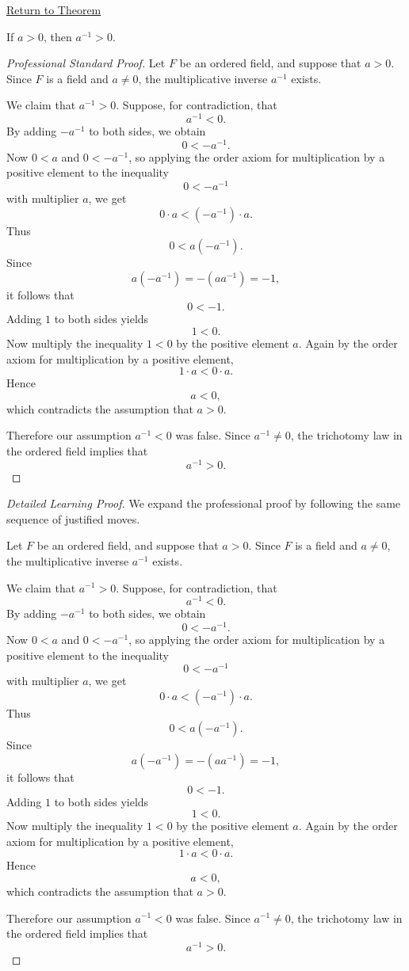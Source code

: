 \newpage
{}
\label{prf:inverse-positive}

\begin{remark*}[Return]
\hyperref[thm:inverse-positive]{Return to Theorem}
\end{remark*}

\begin{theorem*}
If $a>0$, then $a^{-1}>0$.
\end{theorem*}

\begin{proof}[Professional Standard Proof]
\LRAProofBodyStart
Let $F$ be an ordered field, and suppose that $a>0$.  Since $F$ is a field
and $a\neq 0$, the multiplicative inverse $a^{-1}$ exists.

We claim that $a^{-1}>0$.  Suppose, for contradiction, that
\[
a^{-1}<0.
\]
By adding $-a^{-1}$ to both sides, we obtain
\[
0<-a^{-1}.
\]
Now $0<a$ and $0<-a^{-1}$, so applying the order axiom for multiplication by
a positive element to the inequality
\[
0<-a^{-1}
\]
with multiplier $a$, we get
\[
0\cdot a<(-a^{-1})\cdot a.
\]
Thus
\[
0<a(-a^{-1}).
\]
Since
\[
a(-a^{-1})=-(aa^{-1})=-1,
\]
it follows that
\[
0<-1.
\]
Adding $1$ to both sides yields
\[
1<0.
\]
Now multiply the inequality $1<0$ by the positive element $a$.  Again by the
order axiom for multiplication by a positive element,
\[
1\cdot a<0\cdot a.
\]
Hence
\[
a<0,
\]
which contradicts the assumption that $a>0$.

Therefore our assumption $a^{-1}<0$ was false.  Since $a^{-1}\neq 0$, the
trichotomy law in the ordered field implies that
\[
a^{-1}>0.
\]
\end{proof}

\begin{proof}[Detailed Learning Proof]
\LRAProofBodyStart
We expand the professional proof by following the same sequence of justified moves.

Let $F$ be an ordered field, and suppose that $a>0$.  Since $F$ is a field
and $a\neq 0$, the multiplicative inverse $a^{-1}$ exists.

We claim that $a^{-1}>0$.  Suppose, for contradiction, that
\[
a^{-1}<0.
\]
By adding $-a^{-1}$ to both sides, we obtain
\[
0<-a^{-1}.
\]
Now $0<a$ and $0<-a^{-1}$, so applying the order axiom for multiplication by
a positive element to the inequality
\[
0<-a^{-1}
\]
with multiplier $a$, we get
\[
0\cdot a<(-a^{-1})\cdot a.
\]
Thus
\[
0<a(-a^{-1}).
\]
Since
\[
a(-a^{-1})=-(aa^{-1})=-1,
\]
it follows that
\[
0<-1.
\]
Adding $1$ to both sides yields
\[
1<0.
\]
Now multiply the inequality $1<0$ by the positive element $a$.  Again by the
order axiom for multiplication by a positive element,
\[
1\cdot a<0\cdot a.
\]
Hence
\[
a<0,
\]
which contradicts the assumption that $a>0$.

Therefore our assumption $a^{-1}<0$ was false.  Since $a^{-1}\neq 0$, the
trichotomy law in the ordered field implies that
\[
a^{-1}>0.
\]
\end{proof}

